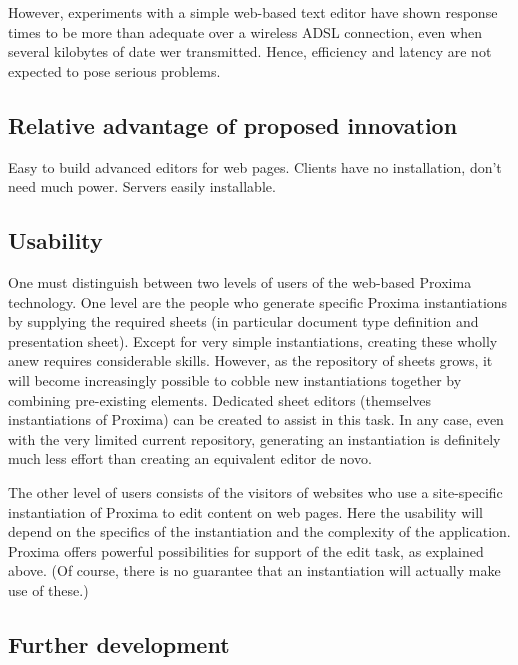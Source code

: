 \documentclass[10pt]{article}
\begin{document}
However, experiments with a simple web-based text editor have shown response times to be more than adequate over a wireless ADSL connection, even when several kilobytes of date wer transmitted. Hence, efficiency and latency are not expected to pose serious problems. 
\ec

\subsection{Relative advantage of proposed innovation}

Easy to build advanced editors for web pages. Clients have no installation, don't need much power. Servers easily installable.


\subsection{Usability}

One must distinguish between two levels of users of the web-based Proxima technology. One level are the people who generate specific Proxima instantiations by supplying the required sheets (in particular document type definition and presentation sheet). Except for very simple instantiations, creating these wholly anew requires considerable skills. However, as the repository of sheets grows, it will become increasingly possible to cobble new instantiations together by combining pre-existing elements.  Dedicated sheet editors (themselves instantiations of Proxima) can be created to assist in this task. In any case, even with the very limited current repository, generating an instantiation is definitely much less effort than creating an equivalent editor de novo.

The other level of users consists of the visitors of websites who use a site-specific instantiation of Proxima to edit content on web pages. Here the usability will depend on the specifics of the instantiation and the complexity of the application. Proxima offers powerful possibilities for support of the edit task, as explained above. (Of course, there is no guarantee that an instantiation will actually make use of these.)






\subsection{Further development}
\end{document}
